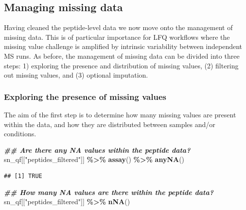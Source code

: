 \documentclass[9pt,a4paper,]{extarticle}
\newenvironment{Shaded}{\begin{snugshade}}{\end{snugshade}}
\newcommand{\DocumentationTok}[1]{\textcolor[rgb]{0.56,0.35,0.01}{\textbf{\textit{#1}}}}
\newcommand{\FunctionTok}[1]{\textcolor[rgb]{0.13,0.29,0.53}{\textbf{#1}}}
\newcommand{\NormalTok}[1]{#1}
\newcommand{\SpecialCharTok}[1]{\textcolor[rgb]{0.81,0.36,0.00}{\textbf{#1}}}
\newcommand{\StringTok}[1]{\textcolor[rgb]{0.31,0.60,0.02}{#1}}
\begin{document}
\hypertarget{managing-missing-data-1}{%
\subsection{Managing missing data}\label{managing-missing-data-1}}

Having cleaned the peptide-level data we now move onto the management of missing
data. This is of particular importance for LFQ workflows where the missing value
challenge is amplified by intrinsic variability between independent MS runs. As
before, the management of missing data can be divided into three steps: 1)
exploring the presence and distribution of missing values, (2) filtering out
missing values, and (3) optional imputation.

\hypertarget{exploring-the-presence-of-missing-values-1}{%
\subsubsection{Exploring the presence of missing values}\label{exploring-the-presence-of-missing-values-1}}

The aim of the first step is to determine how many missing values are present
within the data, and how they are distributed between samples and/or conditions.

\begin{Shaded}
\begin{Highlighting}[]
\DocumentationTok{\#\# Are there any NA values within the peptide data?}
\NormalTok{sn\_qf[[}\StringTok{"peptides\_filtered"}\NormalTok{]] }\SpecialCharTok{\%\textgreater{}\%}
  \FunctionTok{assay}\NormalTok{() }\SpecialCharTok{\%\textgreater{}\%}
  \FunctionTok{anyNA}\NormalTok{()}
\end{Highlighting}
\end{Shaded}

\begin{verbatim}
## [1] TRUE
\end{verbatim}

\begin{Shaded}
\begin{Highlighting}[]
\DocumentationTok{\#\# How many NA values are there within the peptide data?}
\NormalTok{sn\_qf[[}\StringTok{"peptides\_filtered"}\NormalTok{]] }\SpecialCharTok{\%\textgreater{}\%}
  \FunctionTok{nNA}\NormalTok{()}
\end{Highlighting}
\end{Shaded}
\end{document}
